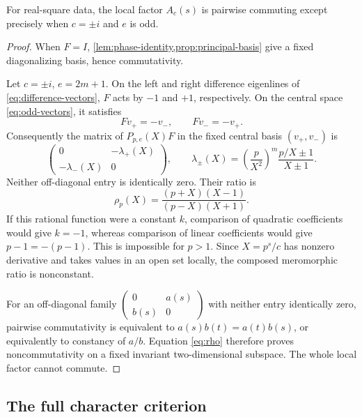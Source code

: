 \begin{proposition}\label{prop:local-parity}
For real-square data, the local factor \(A_c(s)\) is pairwise
commuting except precisely when \(c=\pm i\) and \(e\) is odd.
\end{proposition}
\begin{proof}
When \(F=I\), \cref{lem:phase-identity,prop:principal-basis}
give a fixed diagonalizing basis, hence commutativity.

Let \(c=\pm i\), \(e=2m+1\). On the left and right difference
eigenlines of \eqref{eq:difference-vectors}, \(F\) acts by
\(-1\) and \(+1\), respectively. On the central space
\eqref{eq:odd-vectors}, it satisfies
\[
 Fv_+=-v_-,\qquad Fv_-=-v_+.
\]
Consequently the matrix of \(P_{p,e}(X)F\) in the fixed central
basis \((v_+,v_-)\) is
\begin{equation}\label{eq:odd-obstruction-block}
 \begin{pmatrix}0&-\lambda_+(X)\\
                 -\lambda_-(X)&0\end{pmatrix},\qquad
 \lambda_\pm(X)=\left(\frac{p}{X^2}\right)^m
                    \frac{p/X\pm1}{X\pm1}.
\end{equation}
Neither off-diagonal entry is identically zero. Their ratio is
\begin{equation}\label{eq:rho}
 \rho_p(X)=\frac{(p+X)(X-1)}{(p-X)(X+1)}.
\end{equation}
If this rational function were a constant \(k\), comparison
of quadratic coefficients would give \(k=-1\), whereas comparison
of linear coefficients would give \(p-1=-(p-1)\).
This is impossible for \(p>1\). Since \(X=p^s/c\) has nonzero
derivative and takes values in an open set locally, the composed
meromorphic ratio is nonconstant.

For an off-diagonal family
\(\left(\begin{smallmatrix}0&a(s)\\b(s)&0\end{smallmatrix}\right)\)
with neither entry identically zero, pairwise commutativity is
equivalent to
\(a(s)b(t)=a(t)b(s)\), or equivalently to constancy of \(a/b\).
Equation \eqref{eq:rho} therefore proves noncommutativity on a
fixed invariant two-dimensional subspace. The whole local
factor cannot commute.
\end{proof}
\ParityTable

\subsection{The full character criterion}

